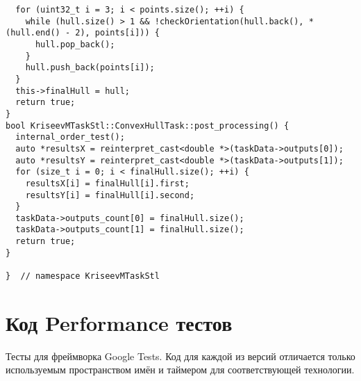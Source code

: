 \documentclass[a4paper,12pt]{article}
\begin{document}
\begin{lstlisting}
  for (uint32_t i = 3; i < points.size(); ++i) {
    while (hull.size() > 1 && !checkOrientation(hull.back(), *(hull.end() - 2), points[i])) {
      hull.pop_back();
    }
    hull.push_back(points[i]);
  }
  this->finalHull = hull;
  return true;
}
bool KriseevMTaskStl::ConvexHullTask::post_processing() {
  internal_order_test();
  auto *resultsX = reinterpret_cast<double *>(taskData->outputs[0]);
  auto *resultsY = reinterpret_cast<double *>(taskData->outputs[1]);
  for (size_t i = 0; i < finalHull.size(); ++i) {
    resultsX[i] = finalHull[i].first;
    resultsY[i] = finalHull[i].second;
  }
  taskData->outputs_count[0] = finalHull.size();
  taskData->outputs_count[1] = finalHull.size();
  return true;
}

}  // namespace KriseevMTaskStl
\end{lstlisting}

\section{Код Performance тестов}

Тесты для фреймворка Google Tests. Код для каждой из версий отличается 
только используемым пространством имён и таймером для соответствующей технологии.
\end{document}
